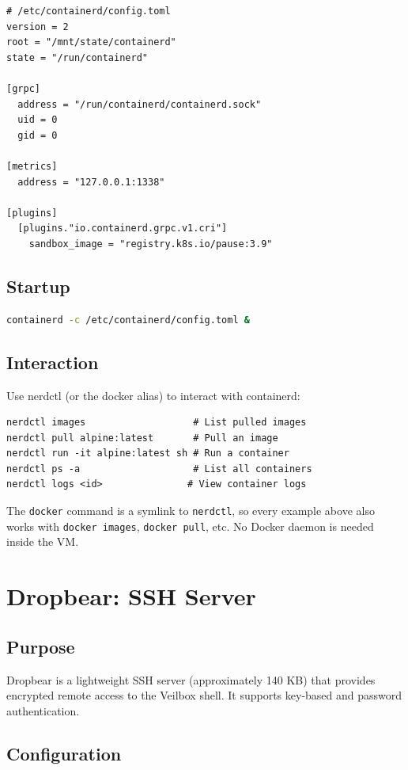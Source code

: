 \begin{lstlisting}
# /etc/containerd/config.toml
version = 2
root = "/mnt/state/containerd"
state = "/run/containerd"

[grpc]
  address = "/run/containerd/containerd.sock"
  uid = 0
  gid = 0

[metrics]
  address = "127.0.0.1:1338"

[plugins]
  [plugins."io.containerd.grpc.v1.cri"]
    sandbox_image = "registry.k8s.io/pause:3.9"
\end{lstlisting}

\subsection{Startup}

\begin{lstlisting}[language=bash]
containerd -c /etc/containerd/config.toml &
\end{lstlisting}

\subsection{Interaction}

Use nerdctl (or the docker alias) to interact with containerd:
\begin{lstlisting}
nerdctl images                   # List pulled images
nerdctl pull alpine:latest       # Pull an image
nerdctl run -it alpine:latest sh # Run a container
nerdctl ps -a                    # List all containers
nerdctl logs <id>               # View container logs
\end{lstlisting}
The \texttt{docker} command is a symlink to \texttt{nerdctl}, so every
example above also works with \texttt{docker images}, \texttt{docker pull},
etc. No Docker daemon is needed inside the VM.

\section{Dropbear: SSH Server}

\subsection{Purpose}

Dropbear is a lightweight SSH server (approximately 140 KB) that provides
encrypted remote access to the Veilbox shell. It supports key-based and
password authentication.

\subsection{Configuration}

